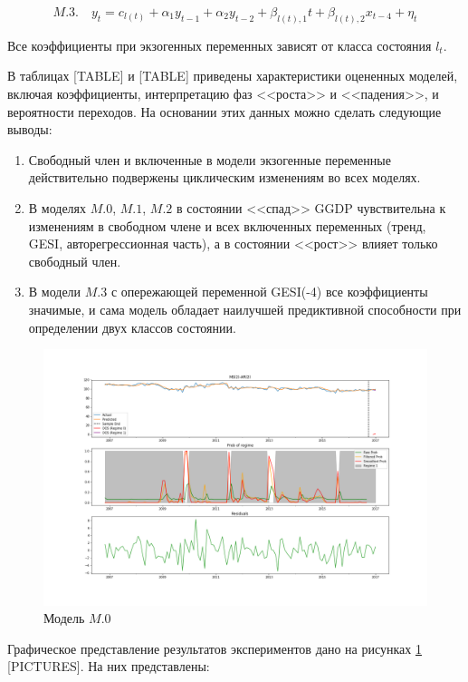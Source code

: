 \documentclass[a4paper,14pt]{extreport}
\begin{document}
\[
	M.3. \quad y_t = c_{l(t)} + \alpha_1 y_{t-1} + \alpha_2 y_{t-2} + \beta_{l(t), 1} t + \beta_{l(t), 2} x_{t-4} + \eta_t
\]

Все коэффициенты при экзогенных переменных зависят от класса состояния $l_t$.

В таблицах [TABLE] и [TABLE] приведены характеристики оцененных моделей, включая коэффициенты, интерпретацию фаз <<роста>> и <<падения>>, и вероятности переходов. На основании этих данных можно сделать следующие выводы:

\begin{enumerate}
	\item Свободный член и включенные в модели экзогенные переменные действительно подвержены циклическим изменениям во всех моделях.
	\item В моделях $M.0$, $M.1$, $M.2$ в состоянии <<спад>> GGDP чувствительна к изменениям в свободном члене и всех включенных переменных (тренд, GESI, авторегрессионная часть), а в состоянии <<рост>> влияет только свободный член.
	\item В модели $M.3$ с опережающей переменной GESI(-4) все коэффициенты значимые, и сама модель обладает наилучшей предиктивной способности при определении двух классов состоянии.
\end{enumerate}


\begin{figure}[h!]
	\includegraphics[width=\linewidth]{img/manual/model_m0.png}
	\caption{Модель $M.0$}
	\label{fig:sm_model_m0}
\end{figure}


Графическое представление результатов экспериментов дано на рисунках \ref{fig:sm_model_m0} [PICTURES]. На них представлены:
\end{document}

